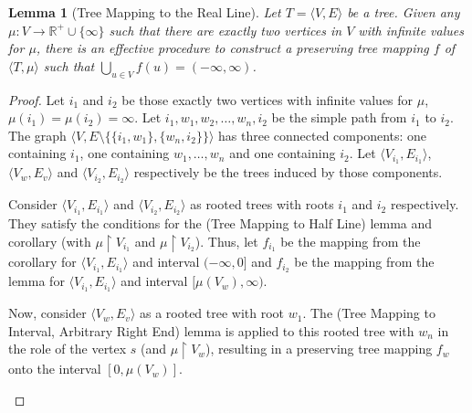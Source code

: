 \documentclass{article}
\newtheorem*{lemma}{Lemma}
\newcommand{\R}{\mathbb{R}}
\begin{document}
\begin{lemma}[Tree Mapping to the Real Line]
    Let $T = \langle V, E \rangle$ be a tree. Given any $\mu : V \rightarrow \R^+ \cup \{\infty\}$ such that there are exactly two vertices in $V$ with infinite values for $\mu$, there is an effective procedure to construct a preserving tree mapping $f$ of $\langle T, \mu \rangle$ such that $\bigcup_{u \in V}f(u) = (-\infty, \infty)$.
\end{lemma}
\begin{proof}
Let $i_1$ and $i_2$ be those exactly two vertices with infinite values for $\mu$, $\mu(i_1) = \mu(i_2) = \infty$. Let $i_1, w_1, w_2, \dots, w_n, i_2$ be the simple path from $i_1$ to $i_2$. The graph $\langle V, E \setminus \{\{i_1, w_1\}, \{w_n, i_2\}\} \rangle$ has three connected components: one containing $i_1$, one containing $w_1, \dots, w_n$ and one containing $i_2$. Let $\langle V_{i_1}, E_{i_1} \rangle$, $\langle V_w, E_v \rangle$ and $\langle V_{i_2}, E_{i_2} \rangle$ respectively be the trees induced by those components.

  Consider $\langle V_{i_1}, E_{i_1} \rangle$ and $\langle V_{i_2}, E_{i_2} \rangle$ as rooted trees with roots $i_1$ and $i_2$ respectively. They satisfy the conditions for the (Tree Mapping to Half Line) lemma and corollary (with $\mu \restriction V_{i_1}$ and $\mu \restriction V_{i_2}$). Thus, let $f_{i_1}$ be the mapping from the corollary for $\langle V_{i_1}, E_{i_1} \rangle$ and interval $(-\infty, 0]$ and $f_{i_2}$ be the mapping from the lemma for $\langle V_{i_1}, E_{i_1} \rangle$ and interval $[\mu(V_w), \infty)$.

    Now, consider $\langle V_w, E_v \rangle$ as a rooted tree with root $w_1$. The (Tree Mapping to Interval, Arbitrary Right End) lemma is applied to this rooted tree with $w_n$ in the role of the vertex $s$ (and $\mu \restriction V_w$), resulting in a preserving tree mapping $f_w$ onto the interval $[0, \mu(V_w)]$.

    \begin{figure}[ht]
      \centering
\end{figure}
\end{proof}
\end{document}
